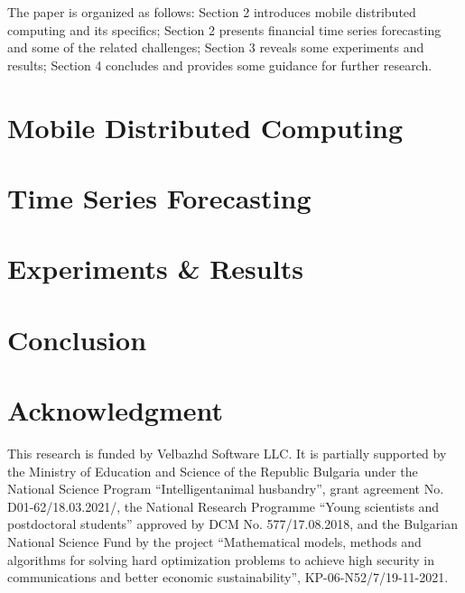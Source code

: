 \documentclass[conference]{IEEEtran}
\begin{document}
The paper is organized as follows: Section 2 introduces mobile distributed computing and its specifics; Section 2 presents financial time series forecasting and some of the related challenges; Section 3 reveals some experiments and results; Section 4 concludes and provides some guidance for further research.

\section{Mobile Distributed Computing}

\subsection{}

\section{Time Series Forecasting}

\subsection{}

\section{Experiments \& Results}

\subsection{}

\section{Conclusion}

\section*{Acknowledgment}

This research is funded by Velbazhd Software LLC. It is partially supported by the Ministry of Education and Science of the Republic Bulgaria under the National Science Program “Intelligentanimal husbandry”, grant agreement No. D01-62/18.03.2021/, the National Research Programme “Young scientists and postdoctoral students” approved by DCM No. 577/17.08.2018, and the Bulgarian National Science Fund by the project “Mathematical models, methods and algorithms for solving hard optimization problems to achieve high security in communications and better economic sustainability”, KP-06-N52/7/19-11-2021.


\end{document}
